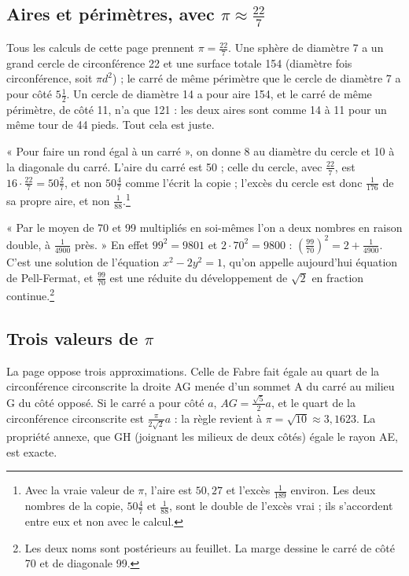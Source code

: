 \documentclass[11pt,a4paper]{article}
\begin{document}
\subsection*{Aires et périmètres, avec $\pi \approx \frac{22}{7}$}

Tous les calculs de cette page prennent $\pi = \frac{22}{7}$. Une sphère de
diamètre 7 a un grand cercle de circonférence 22 et une surface totale 154
(diamètre fois circonférence, soit $\pi d^2$) ; le carré de même périmètre que
le cercle de diamètre 7 a pour côté $5\frac12$. Un cercle de diamètre 14 a pour
aire 154, et le carré de même périmètre, de côté 11, n'a que 121 : les deux aires
sont comme 14 à 11 pour un même tour de 44 pieds. Tout cela est juste.

« Pour faire un rond égal à un carré », on donne 8 au diamètre du cercle et 10
à la diagonale du carré. L'aire du carré est 50 ; celle du cercle, avec
$\frac{22}{7}$, est $16 \cdot \frac{22}{7} = 50\frac27$, et non $50\frac47$
comme l'écrit la copie ; l'excès du cercle est donc $\frac{1}{176}$ de sa
propre aire, et non $\frac{1}{88}$.\footnote{Avec la vraie valeur de $\pi$,
l'aire est $50{,}27$ et l'excès $\frac{1}{189}$ environ. Les deux nombres de la
copie, $50\frac47$ et $\frac{1}{88}$, sont le double de l'excès vrai ; ils
s'accordent entre eux et non avec le calcul.}

« Par le moyen de 70 et 99 multipliés en soi-mêmes l'on a deux nombres en
raison double, à $\frac{1}{4900}$ près. » En effet $99^2 = 9801$ et
$2 \cdot 70^2 = 9800$ : $\left(\frac{99}{70}\right)^2 = 2 + \frac{1}{4900}$.
C'est une solution de l'équation $x^2 - 2y^2 = 1$, qu'on appelle aujourd'hui
équation de Pell-Fermat, et $\frac{99}{70}$ est une réduite du développement de
$\sqrt2$ en fraction continue.\footnote{Les deux noms sont postérieurs au
feuillet. La marge dessine le carré de côté 70 et de diagonale 99.}

\subsection*{Trois valeurs de $\pi$}

La page oppose trois approximations. Celle de Fabre fait égale au quart de la
circonférence circonscrite la droite AG menée d'un sommet A du carré au milieu
G du côté opposé. Si le carré a pour côté $a$, $AG = \frac{\sqrt5}{2}a$, et le
quart de la circonférence circonscrite est $\frac{\pi}{2\sqrt2}a$ : la règle
revient à $\pi = \sqrt{10} \approx 3{,}1623$. La propriété annexe, que GH
(joignant les milieux de deux côtés) égale le rayon AE, est exacte.
\end{document}
